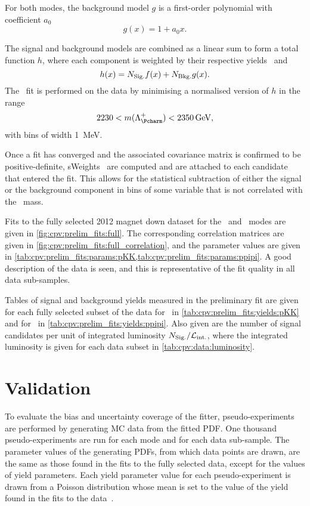 For both modes, the background model $g$ is a first-order polynomial with 
coefficient $a_{0}$
\begin{equation}
  g(x) = 1 + a_{0}x.
  \label{eqn:cpv:prelim_fits:bkg_model}
\end{equation}

The signal and background models are combined as a linear sum to form a total 
function $h$, where each component is weighted by their respective yields 
\nsig\ and \nbkg
\begin{equation}
  h(x) = N_{\text{Sig.}} f(x) + N_{\text{Bkg.}} g(x).
\end{equation}
The \chisq\ fit is performed on the data by minimising a normalised version of 
$h$ in the range
\begin{equation}
  2230 < m(\PLambdac) < \SI{2350}{\GeV},
\end{equation}
with bins of width \SI{1}{\MeV}.

Once a fit has converged and the associated covariance matrix is confirmed to 
be positive-definite, sWeights~\cite{Pivk:2004ty} are computed and are attached 
to each candidate that entered the fit.
This allows for the statistical subtraction of either the signal or the 
background component in bins of some variable that is not correlated with the 
\PLambdac\ mass.

Fits to the fully selected 2012 magnet down dataset for the \pKK\ and \ppipi\ 
modes are given in \cref{fig:cpv:prelim_fits:full}.
The corresponding correlation matrices are given in 
\cref{fig:cpv:prelim_fits:full_correlation}, and the parameter values are given 
in \cref{tab:cpv:prelim_fits:params:pKK,tab:cpv:prelim_fits:params:ppipi}.
A good description of the data is seen, and this is representative of the fit 
quality in all data sub-samples.

Tables of signal and background yields measured in the preliminary fit are 
given for each fully selected subset of the data for \pKK\ in 
\cref{tab:cpv:prelim_fits:yields:pKK} and for \ppipi\ in 
\cref{tab:cpv:prelim_fits:yields:ppipi}.
Also given are the number of signal candidates per unit of integrated 
luminosity $N_{\text{Sig.}}/\mathcal{L}_{\textnormal{int.}}$, where the integrated luminosity is given for each 
data subset in \cref{tab:cpv:data:luminosity}.

\section{Validation}
\label{chap:cpv:prelim_fits:validation}

To evaluate the bias and uncertainty coverage of the fitter, pseudo-experiments 
are performed by generating \ac{MC} data from the fitted \ac{PDF}.
One thousand pseudo-experiments are run for each mode and for each data 
sub-sample.
The parameter values of the generating \acp{PDF}, from which data points are 
drawn, are the same as those found in the fits to the fully selected data, 
except for the values of yield parameters.
Each yield parameter value for each pseudo-experiment is drawn from a Poisson 
distribution whose mean is set to the value of the yield found in the fits to 
the data~\cite{Karbach:2012vg}.

